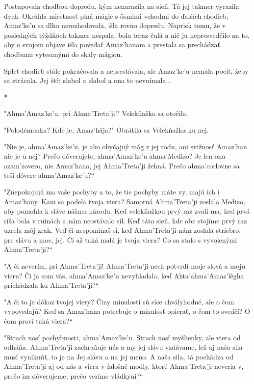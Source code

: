 \documentclass{book}
\begin{document}
Postupovala chodbou dopredu, kým nenarazila na sieň. Tá jej takmer vyrazila dych. Okrúhla miestnosť plná mágie s ôsmimi vchodmi do ďalších chodieb. Amaz'ke'u sa dlho nerozhodovala, išla rovno dopredu. Napriek tomu, že v posledných týždňoch takmer nespala, bola teraz čulá a nič ju nepresvedčilo na to, aby o svojom objave išla povedať Amaz'hanam a prestala sa prechádzať chodbami vytesanými do skaly mágiou.

Spleť chodieb stále pokračovala a neprestávala, ale Amaz'ke'u nemala pocit, žeby sa strácala. Jej štít slabol a slabol a ona to nevnímala...

\begin{center}
*
\end{center}

"$ $Ahma'Amaz'ke'u, pri Ahma'Treta'ji!"$ $ Velekňažka sa otočila.

"$ $Polodémonka? Kde je, Amaz'ha\v{}ja?"$ $ Obrátila sa Velekňažka ku nej.

"$ $Nie je, ahma'Amaz'ke'u, je ako obyčajný mág z jej rodu, ani svižnosť Amaz'han nie je u nej? Prečo dôverujete, ahma'Amaz'ke'u ahma'Medizo? Je len ona azam'zovero, nie Amaz'hana, jej Ahma'Treta'ji žehná. Prečo ahma'corlovne sa teší dôvere ahma'Amaz'ke'u?“

"$ $Znepokojujú ma vaše pochyby a to, že tie pochyby máte vy, majú ich i Amaz'hany. Kam sa podela tvoja viera? Samotná Ahma'Treta'ji zoslala Medizo, aby pomohla k sláve nášmu národu. Keď velekňažkou prvý raz zvali ma, keď prvá ríša bola v ruinách a nám neostávalo síl. Keď táto sieň, kde obe stojíme prvý raz uzrela môj zrak. Veď či nespomínaš si, keď Ahma'Treta'ji nám zoslala striebro, pre slávu a moc, jej. Či až taká malá je tvoja viera? Čo sa stalo s vyvolenými Ahma'Treta'ji?“

"$ $A či neverím, pri Ahma'Treta'ji! Ahma'Treta'ji nech potvrdí moje slová a moju vieru? Či ja som vás, ahma'Amaz'ke'u nevyhľadala, keď Ahta'ahma'Amaz'le\v{}gha prichádzala ku Ahma'Treta'ji?“

"$ $A či to je dôkaz tvojej viery? Činy minulosti sú síce chvályhodné, ale o čom vypovedajú? Keď sa Amaz'hana potrebuje o minulosť opierať, o čom to svedčí? O čom praví taká viera?“

"$ $Strach nosí pochybnosti, ahma'Amaz'ke'u. Strach nosí myšlienky, ale viera od odháňa. Ahma'Treta'ji zachraňuje nás a my jej slávu vzdávame, lež aj naša sila musí vyniknúť, to je na Jej slávu a na jej meno. A naša sila, tá pochádza od Ahma'Treta'ji aj od nás a viera v falošné modly, ktoré Ahma'Treta'ji neveria v, prečo im dôverujeme, prečo veríme vládkyni?“
\end{document}

